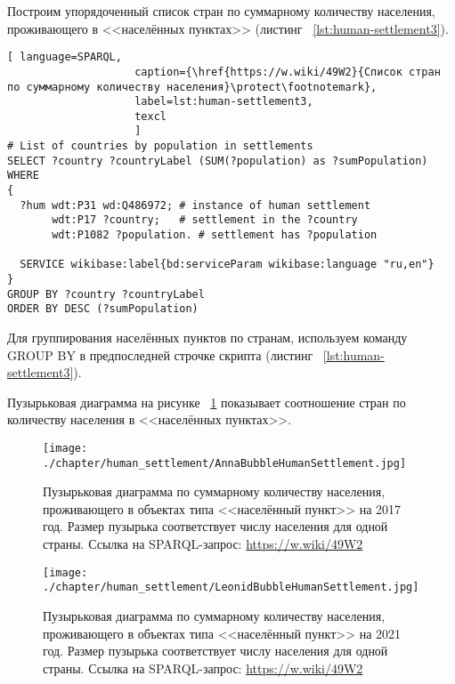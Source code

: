Построим упорядоченный список стран по суммарному количеству населения, проживающего в <<населённых пунктах>> (листинг ~\protect\ref{lst:human-settlement3}).

\begin{lstlisting}[ language=SPARQL, 
                    caption={\href{https://w.wiki/49W2}{Список стран по суммарному количеству населения}\protect\footnotemark},
                    label=lst:human-settlement3,
                    texcl 
                    ]
# List of countries by population in settlements
SELECT ?country ?countryLabel (SUM(?population) as ?sumPopulation)
WHERE
{
  ?hum wdt:P31 wd:Q486972; # instance of human settlement
       wdt:P17 ?country;   # settlement in the ?country
       wdt:P1082 ?population. # settlement has ?population
  
  SERVICE wikibase:label{bd:serviceParam wikibase:language "ru,en"}
}
GROUP BY ?country ?countryLabel 
ORDER BY DESC (?sumPopulation)
\end{lstlisting}%

Для группирования населённых пунктов по странам, используем команду GROUP BY в предпоследней строчке скрипта (листинг ~\protect\ref{lst:human-settlement3}).

Пузырьковая диаграмма на рисунке ~\ref{fig:human-settlement-1} показывает соотношение стран по количеству населения в <<населённых пунктах>>.

\begin{figure}
\centering
	\texttt{[image: ./chapter/human\_settlement/AnnaBubbleHumanSettlement.jpg]}
	\label{fig:human-settlement-1}
    \caption[Пузырьковая диаграмма  по суммарному количеству населения в населённых пунктах, 2017.]{Пузырьковая диаграмма  по суммарному количеству населения, проживающего в объектах типа <<населённый пункт>> на 2017 год. Размер пузырька соответствует числу населения для одной страны. Ссылка на SPARQL-запрос: \href{https://w.wiki/49W2}{https://w.wiki/49W2}}
\end{figure}

\begin{figure}
\centering
	\texttt{[image: ./chapter/human\_settlement/LeonidBubbleHumanSettlement.jpg]}
	\label{fig:human-settlement-2}
	\caption[Пузырьковая диаграмма  по суммарному количеству населения в населённых пунктах, 2021.]{Пузырьковая диаграмма  по суммарному количеству населения, проживающего в объектах типа <<населённый пункт>> на 2021 год. Размер пузырька соответствует числу населения для одной страны. Ссылка на SPARQL-запрос: \href{https://w.wiki/49W2}{https://w.wiki/49W2}}
\end{figure}

